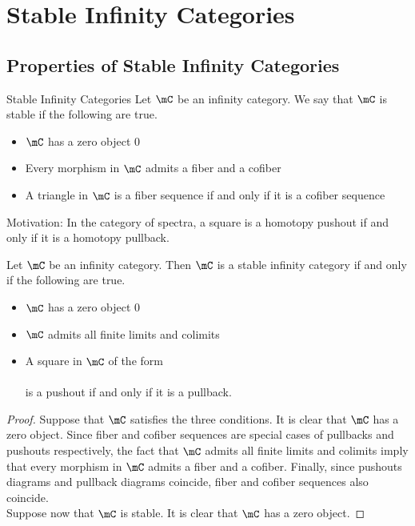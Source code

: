 \documentclass[a4paper]{article}
\begin{document}
\pagebreak
\section{Stable Infinity Categories}
\subsection{Properties of Stable Infinity Categories}
\begin{defn}{Stable Infinity Categories}{} Let $\mC$ be an infinity category. We say that $\mC$ is stable if the following are true. 
\begin{itemize}
\item $\mC$ has a zero object $0$
\item Every morphism in $\mC$ admits a fiber and a cofiber
\item A triangle in $\mC$ is a fiber sequence if and only if it is a cofiber sequence
\end{itemize}
\end{defn}

Motivation: In the category of spectra, a square is a homotopy pushout if and only if it is a homotopy pullback. 

\begin{prp}{}{} Let $\mC$ be an infinity category. Then $\mC$ is a stable infinity category if and only if the following are true. 
\begin{itemize}
\item $\mC$ has a zero object $0$
\item $\mC$ admits all finite limits and colimits
\item A square in $\mC$ of the form \\
\\
is a pushout if and only if it is a pullback. 
\end{itemize} 
\begin{proof}
Suppose that $\mC$ satisfies the three conditions. It is clear that $\mC$ has a zero object. Since fiber and cofiber sequences are special cases of pullbacks and pushouts respectively, the fact that $\mC$ admits all finite limits and colimits imply that every morphism in $\mC$ admits a fiber and a cofiber. Finally, since pushouts diagrams and pullback diagrams coincide, fiber and cofiber sequences also coincide. \\

Suppose now that $\mC$ is stable. It is clear that $\mC$ has a zero object. 
\end{proof}
\end{prp}
\end{document}
